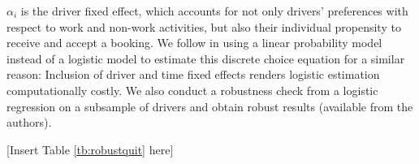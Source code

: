 \documentclass[reviewmode]{AEA}
\begin{document}
$\alpha_i$ is the driver fixed effect, which accounts for not only drivers' preferences with respect to work and non-work activities, but also their individual propensity to receive and accept a booking. %
We follow \citet{farber2015you} in using a linear probability model instead of a logistic model to estimate this discrete choice equation for a similar reason: Inclusion of driver and time fixed effects renders logistic estimation computationally costly. We also conduct a robustness check from a logistic regression on a subsample of drivers and obtain robust results (available from the authors).

\begin{center}
	[Insert Table \ref{tb:robustquit} here]
\end{center}
\end{document}
